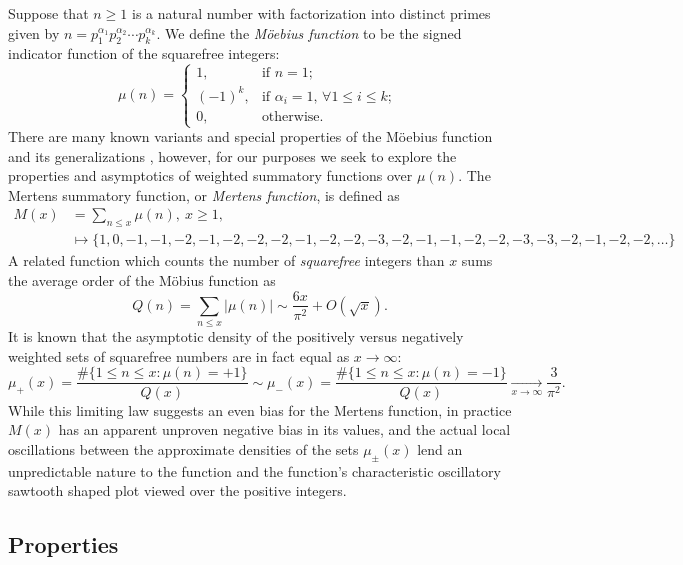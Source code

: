 \documentclass[11pt,reqno,a4letter]{article}
\numberwithin{figure}{section}
\numberwithin{table}{section}
\newcommand{\cf}{\textit{cf.\ }}
\newcommand{\seqnum}[1]{\href{http://oeis.org/#1}{\color{ProcessBlue}{\underline{#1}}}}
\theoremstyle{plain}
\numberwithin{theorem}{section}
\theoremstyle{definition}
\begin{document}
Suppose that $n \geq 1$ is a natural number with factorization into 
distinct primes given by 
$n = p_1^{\alpha_1} p_2^{\alpha_2} \cdots p_k^{\alpha_k}$. 
We define the \emph{M\"oebius function} to be the signed indicator function 
of the squarefree integers: 
\[
\mu(n) = \begin{cases} 
     1, & \text{if $n = 1$; } \\ 
     (-1)^k, & \text{if $\alpha_i = 1$, $\forall 1 \leq i \leq k$; } \\ 
     0, & \text{otherwise.} 
     \end{cases} 
\]
There are many known variants and special properties of the M\"oebius function 
and its generalizations \cite[\cf \S 2]{HANDBOOKNT-2004}, however, for our 
purposes we seek to explore the properties and asymptotics of weighted 
summatory functions over $\mu(n)$. 
The Mertens summatory function, or \emph{Mertens function}, is defined as 
\cite[\seqnum{A002321}]{OEIS} 
\begin{align*} 
M(x) & = \sum_{n \leq x} \mu(n),\ x \geq 1, \\ 
     & \longmapsto \{1, 0, -1, -1, -2, -1, -2, -2, -2, -1, -2, -2, -3, -2, 
     -1, -1, -2, -2, -3, -3, -2, -1, -2, -2, \ldots\}
\end{align*} 
A related function which counts the 
number of \emph{squarefree} integers than $x$ sums the average order of the M\"obius function as 
\cite[\seqnum{A013928}]{OEIS} 
\[ 
Q(n) = \sum_{n \leq x} |\mu(n)| \sim \frac{6x}{\pi^2} + O\left(\sqrt{x}\right). 
\] 
It is known that the asymptotic density of the positively versus negatively 
weighted sets of squarefree numbers are in fact equal as $x \rightarrow \infty$: 
\[
\mu_{+}(x) = \frac{\#\{1 \leq n \leq x: \mu(n) = +1\}}{Q(x)} \sim 
     \mu_{-}(x) = \frac{\#\{1 \leq n \leq x: \mu(n) = -1\}}{Q(x)} 
     \xrightarrow[x \rightarrow \infty]{} \frac{3}{\pi^2}. 
\]
While this limiting law suggests an even bias for the Mertens function, 
in practice $M(x)$ has an apparent unproven negative bias in its values, and the actual 
local oscillations between the approximate densities of the sets 
$\mu_{\pm}(x)$ lend an unpredictable nature to the function and the function's 
characteristic oscillatory sawtooth shaped plot viewed over the positive integers. 

\subsection{Properties} 
\end{document}
